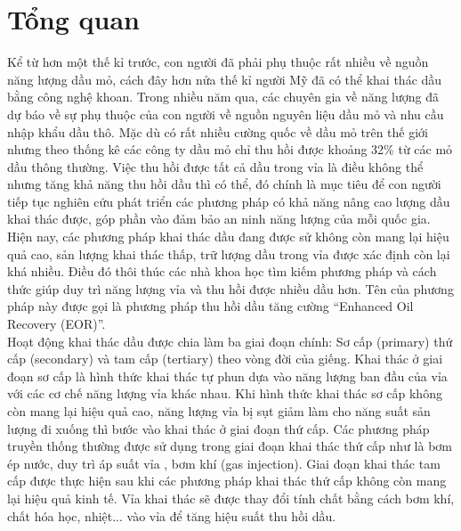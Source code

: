 \documentclass[12pt,a4paper]{article}
\begin{document}
\clearpage
{}
\newpage

\tableofcontents
{}
\newpage

\listoftables
{}
\newpage

\listoffigures
{}
\newpage

\section{Tổng quan}
Kể từ hơn một thế kỉ trước, con người đã phải phụ thuộc rất nhiều về nguồn năng lượng dầu mỏ, cách đây hơn nửa thế kỉ người Mỹ đã có thể khai thác dầu bằng công nghệ khoan. Trong nhiều năm qua, các chuyên gia về năng lượng đã dự báo về sự phụ thuộc của con người về nguồn nguyên liệu dầu mỏ và nhu cầu nhập khẩu dầu thô. Mặc dù có rất nhiều cường quốc về dầu mỏ trên thế giới nhưng theo thống kê các công ty dầu mỏ chỉ thu hồi được khoảng 32\% từ các mỏ dầu thông thường. Việc thu hồi được tất cả dầu trong vỉa là điều không thể nhưng tăng khả năng thu hồi dầu thì có thể, đó chính là mục tiêu để con người tiếp tục nghiên cứu phát triển các phương pháp có khả năng nâng cao lượng dầu khai thác được, góp phần vào đảm bảo an ninh năng lượng của mỗi quốc gia.\\
Hiện nay, các phương pháp khai thác dầu đang được sử không còn mang lại hiệu quả cao, sản lượng khai thác thấp, trữ lượng dầu trong vỉa được xác định còn lại khá nhiều. Điều đó thôi thúc các nhà khoa học tìm kiếm phương pháp và cách thức giúp duy trì năng lượng vỉa và thu hồi được nhiều dầu hơn. Tên của phương pháp này được gọi là phương pháp thu hồi dầu tăng cường “Enhanced Oil Recovery (EOR)”.\\
Hoạt động khai thác dầu được chia làm ba giai đoạn chính: Sơ cấp (primary) thứ cấp (secondary) và tam cấp (tertiary) \cite{green1998enhanced} theo vòng đời của giếng. Khai thác ở giai đoạn sơ cấp là hình thức khai thác tự phun dựa vào năng lượng ban đầu của vỉa với các cơ chế năng lượng vỉa khác nhau. Khi hình thức khai thác sơ cấp không còn mang lại hiệu quả cao, năng lượng vỉa bị sụt giảm làm cho năng suất sản lượng đi xuống thì bước vào khai thác ở giai đoạn thứ cấp. Các phương pháp truyền thống thường được sử dụng trong giai đoạn khai thác thứ cấp như là bơm ép nước, duy trì áp suất vỉa , bơm khí (gas injection). Giai đoạn khai thác tam cấp được thực hiện sau khi các phương pháp khai thác thứ cấp không còn mang lại hiệu quả kinh tế. Vỉa khai thác sẽ được thay đổi tính chất bằng cách bơm khí, chất hóa học, nhiệt... vào vỉa để tăng hiệu suất thu hồi dầu.\\
\end{document}
